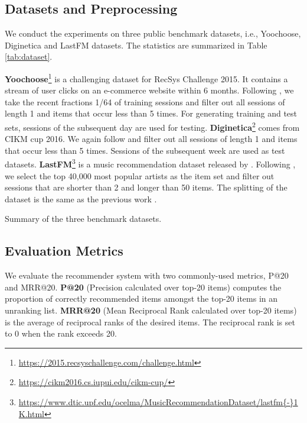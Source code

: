 \documentclass[runningheads]{llncs}
\begin{document}
\subsection{Datasets and Preprocessing}
We conduct the experiments on three public benchmark datasets, 
i.e., {Yoochoose}, {Diginetica} and {LastFM} datasets.  The statistics are summarized in Table \ref{tab:dataset}.




\textbf{Yoochoose}\footnote{\url{https://2015.recsyschallenge.com/challenge.html}} is a challenging dataset for RecSys Challenge 2015. It contains a stream of user clicks on an e-commerce website within 6 months. 
Following \cite{DBLP:conf/cikm/LiRCRLM17,DBLP:conf/aaai/WuT0WXT19}, we take the recent fractions 1/64 of training sessions and filter out all sessions of length 1 and items that occur less than 5 times.
For generating training and test sets, sessions of the subsequent day are used for testing. 
\textbf{Diginetica}\footnote{\url{https://cikm2016.cs.iupui.edu/cikm-cup/}} comes from CIKM cup 2016. 
We again follow \cite{DBLP:conf/cikm/LiRCRLM17,DBLP:conf/aaai/WuT0WXT19} and filter out all sessions of length 1 and items that occur less than 5 times. 
Sessions of the subsequent week are used as test datasets.
\textbf{LastFM}\footnote{\url{https://www.dtic.upf.edu/ocelma/MusicRecommendationDataset/lastfm{-}1K.html} } is a music recommendation dataset released by \cite{Bertin-Mahieux2011}. Following \cite{DBLP:conf/sigir/WangRMCMR19}, we select the top 40,000 most popular artists as the item set and filter out sessions that are shorter than 2 and longer than 50 items. The splitting of the dataset is the same as the previous work \cite{DBLP:conf/sigir/WangRMCMR19}.



\begin{table}[t]
  \centering
  \caption{Summary of the three benchmark datasets.}
  \label{tab:dataset}
  \resizebox{\linewidth}{!}{}
\end{table}



\subsection{Evaluation Metrics}
We evaluate the recommender system with two commonly-used metrics, {P@20} and {MRR@20}. 
\textbf{P@20} (Precision calculated over top-20 items) computes the proportion of correctly recommended items amongst the top-20 items in an unranking list.
\textbf{MRR@20} (Mean Reciprocal Rank calculated over top-20 items) is the average of reciprocal ranks of the desired items. The reciprocal rank is set to 0 when the rank exceeds 20. 
\end{document}

